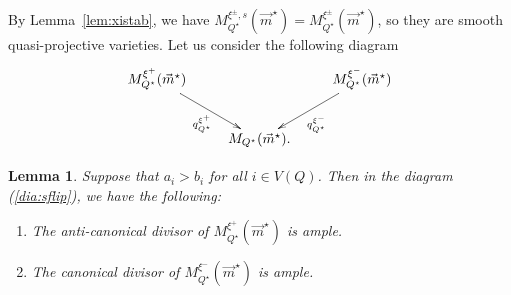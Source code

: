 \documentclass[11pt]{amsart}
\theoremstyle{plain}
\newtheorem{lem}[thm]{Lemma}
\theoremstyle{definition}
\theoremstyle{remark}
\begin{document}
By Lemma~\ref{lem:xistab}, we have 
$M_{Q^{\star}}^{\xi^{\pm}, s}(\vec{m}^{\star})
=M_{Q^{\star}}^{\xi^{\pm}}(\vec{m}^{\star})$, 
so they are smooth quasi-projective varieties. 
Let us consider the following diagram
\begin{align}\label{dia:sflip}
\xymatrix{
M_{Q^{\star}}^{\xi^{+}}(\vec{m}^{\star})
 \ar[rd]_-{q_{Q^{\star}}^{\xi^{+}}}
 & & M_{Q^{\star}}^{\xi^{-}}(\vec{m}^{\star}) 
\ar[ld]^-{q_{Q^{\star}}^{\xi^{-}}} \\
& M_{Q^{\star}}(\vec{m}^{\star}). &
} 
\end{align}


\begin{lem}\label{lem:ample}
Suppose that $a_i>b_i$ for all $i \in V(Q)$. Then 
in the diagram (\ref{dia:sflip}), 
we have the following: 
\begin{enumerate}
\item The anti-canonical divisor 
of 
$M_{Q^{\star}}^{\xi^{+}}(\vec{m}^{\star})$ 
is ample. 
\item The 
canonical divisor of 
$M_{Q^{\star}}^{\xi^{-}}(\vec{m}^{\star})$
is ample. 
\end{enumerate}
\end{lem}
\end{document}

